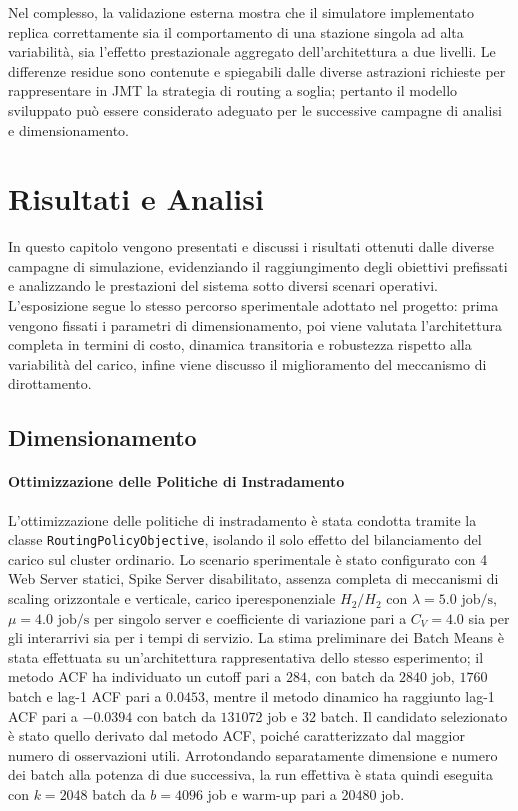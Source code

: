 ﻿\documentclass[a4paper,12pt]{article}
\begin{document}
Nel complesso, la validazione esterna mostra che il simulatore implementato replica correttamente sia il comportamento di una stazione singola ad alta variabilità, sia l'effetto prestazionale aggregato dell'architettura a due livelli. Le differenze residue sono contenute e spiegabili dalle diverse astrazioni richieste per rappresentare in JMT la strategia di routing a soglia; pertanto il modello sviluppato può essere considerato adeguato per le successive campagne di analisi e dimensionamento.

\clearpage


\section{Risultati e Analisi}
In questo capitolo vengono presentati e discussi i risultati ottenuti dalle diverse campagne di simulazione, evidenziando il raggiungimento degli obiettivi prefissati e analizzando le prestazioni del sistema sotto diversi scenari operativi. L'esposizione segue lo stesso percorso sperimentale adottato nel progetto: prima vengono fissati i parametri di dimensionamento, poi viene valutata l'architettura completa in termini di costo, dinamica transitoria e robustezza rispetto alla variabilità del carico, infine viene discusso il miglioramento del meccanismo di dirottamento.


\subsection{Dimensionamento}

\paragraph{Ottimizzazione delle Politiche di Instradamento}
L'ottimizzazione delle politiche di instradamento è stata condotta tramite la classe \texttt{RoutingPolicyObjective}, isolando il solo effetto del bilanciamento del carico sul cluster ordinario. Lo scenario sperimentale è stato configurato con 4 Web Server statici, Spike Server disabilitato, assenza completa di meccanismi di scaling orizzontale e verticale, carico iperesponenziale $H_2/H_2$ con $\lambda = 5.0\text{ job/s}$, $\mu = 4.0\text{ job/s}$ per singolo server e coefficiente di variazione pari a $C_V = 4.0$ sia per gli interarrivi sia per i tempi di servizio. La stima preliminare dei Batch Means è stata effettuata su un'architettura rappresentativa dello stesso esperimento; il metodo ACF ha individuato un cutoff pari a $284$, con batch da $2840$ job, $1760$ batch e lag-1 ACF pari a $0.0453$, mentre il metodo dinamico ha raggiunto lag-1 ACF pari a $-0.0394$ con batch da $131072$ job e $32$ batch. Il candidato selezionato è stato quello derivato dal metodo ACF, poiché caratterizzato dal maggior numero di osservazioni utili. Arrotondando separatamente dimensione e numero dei batch alla potenza di due successiva, la run effettiva è stata quindi eseguita con $k=2048$ batch da $b=4096$ job e warm-up pari a $20480$ job.
\end{document}
